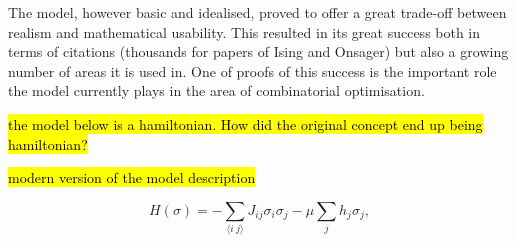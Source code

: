 The model, however basic and idealised, proved to offer a great trade-off between realism and mathematical usability. This resulted in its great success both in terms of citations (thousands for papers of Ising and Onsager) but also a growing number of areas it is used in. One of proofs of this success is the important role the model currently plays in the area of combinatorial optimisation.

\hl{the model below is a hamiltonian. How did the original concept end up being hamiltonian?}

\hl{modern version of the model description}

\[H(\sigma) = -\sum_{\langle i~j\rangle} J_{ij} \sigma_i \sigma_j - \mu \sum_j h_j \sigma_j,\]
